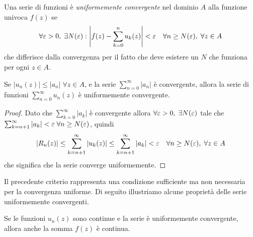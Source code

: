 \begin{definition}
  Una serie di funzioni è \textit{uniformemente convergente} nel dominio $ A $ alla funzione univoca $ f(z) $ se 
  \begin{align}
    \forall \varepsilon > 0, \; \exists N(\varepsilon) : \left| f(z) - \sum_{k = 0}^{n} u_k(z) \right| < \varepsilon \quad \forall n \geq N(\varepsilon), \; \forall z \in A
  \end{align}
  che differisce dalla convergenza per il fatto che deve esistere un $ N $ che funziona per ogni $ z \in A $.
\end{definition}
\begin{theorem}
  Se $ |u_n(z)| \leq |a_n| \; \forall z \in A $, e la serie $ \sum_{n = 0}^\infty |a_n| $ è convergente, allora la serie di funzioni 
  $ \sum_{n = 0}^\infty u_n(z) $ è uniformemente convergente. 
\end{theorem}
\begin{proof}
  Dato che $ \sum_{k = 0}^\infty |a_k| $ è convergente allora $ \forall \varepsilon > 0, \; \exists N(\varepsilon) $ tale che 
  $ \sum_{k = n+1}^\infty |a_k|<\varepsilon \; \forall n \geq N(\varepsilon) $, quindi 
  \begin{align}
    |R_n(z)| \leq \sum_{k = n + 1}^\infty |u_k(z)| \leq \sum_{k = n + 1}^\infty |a_k| < \varepsilon \quad \forall n \geq N(\varepsilon),\; \forall z \in A
  \end{align}
  che significa che la serie converge uniformemente.
\end{proof}
Il precedente criterio rappresenta una condizione sufficiente ma non necessaria per la convergenza uniforme. Di seguito illustriamo alcune 
proprietà delle serie uniformemente convergenti.

\begin{theorem}[  ]
  Se le funzioni $ u_n(z) $ sono continue e la serie è uniformemente convergente, allora anche la somma $ f(z) $ è continua.
\end{theorem}

